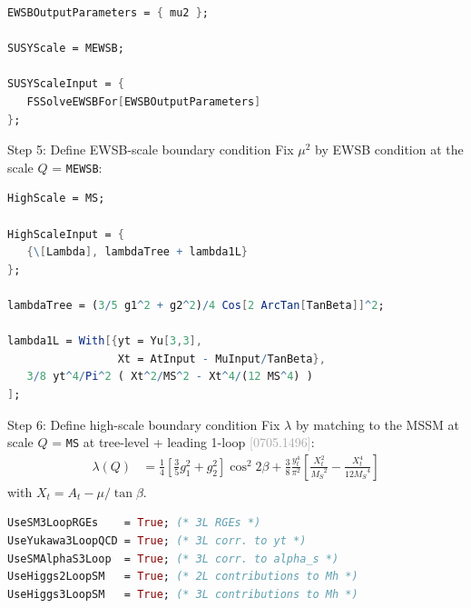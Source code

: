 \documentclass[hyperref={pdfpagelabels=false},ngerman]{beamer}
\newcommand{\MS}{\ensuremath{M_S}}
\newcommand{\bigcite}[1]{\textcolor{darkgray}{[#1]}}
\begin{document}
\begin{lrbox}{\listbox}\begin{lstlisting}[language=Mathematica]
EWSBOutputParameters = { mu2 };

SUSYScale = MEWSB;

SUSYScaleInput = {
   FSSolveEWSBFor[EWSBOutputParameters]
};
\end{lstlisting}\end{lrbox}

\begin{frame}{Step 5: Define EWSB-scale boundary condition}
  Fix $\mu^2$ by EWSB condition at the scale $Q$ = \lstinline{MEWSB}:\\[2em]
  \usebox{\listbox}
\end{frame}

\begin{lrbox}{\listbox}\begin{lstlisting}[language=Mathematica]
HighScale = MS;

HighScaleInput = {
   {\[Lambda], lambdaTree + lambda1L}
};

lambdaTree = (3/5 g1^2 + g2^2)/4 Cos[2 ArcTan[TanBeta]]^2;

lambda1L = With[{yt = Yu[3,3],
                 Xt = AtInput - MuInput/TanBeta},
   3/8 yt^4/Pi^2 ( Xt^2/MS^2 - Xt^4/(12 MS^4) )
];
\end{lstlisting}\end{lrbox}

\begin{frame}{Step 6: Define high-scale boundary condition}
  Fix $\lambda$ by matching to the MSSM at scale
  $Q$ = \texttt{MS} at tree-level + leading 1-loop
  \bigcite{0705.1496}:
  \begin{align*}
    \lambda(Q) &= \frac{1}{4} \left[ \frac{3}{5} g_1^2 + g_2^2 \right] \cos^2 2\beta
    + \frac{3}{8} \frac{y_t^4}{\pi^2}\left[
       \frac{X_t^2}{\MS^2}
       - \frac{X_t^4}{12 \MS^4}
    \right]
  \end{align*}
  with $X_t = A_t - \mu/\tan\beta$.
  \\[1em]
  \usebox{\listbox}
\end{frame}

\begin{lrbox}{\listbox}\begin{lstlisting}[language=Mathematica]
UseSM3LoopRGEs    = True; (* 3L RGEs *)
UseYukawa3LoopQCD = True; (* 3L corr. to yt *)
UseSMAlphaS3Loop  = True; (* 3L corr. to alpha_s *)
UseHiggs2LoopSM   = True; (* 2L contributions to Mh *)
UseHiggs3LoopSM   = True; (* 3L contributions to Mh *)
\end{lstlisting}\end{lrbox}
\end{document}
